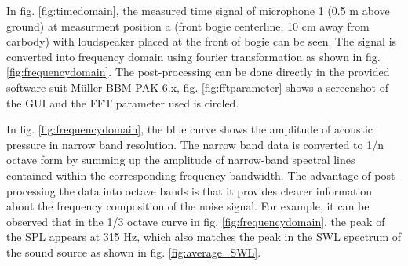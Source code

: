In fig. \ref{fig:timedomain}, the measured time signal of microphone 1 (0.5 m above ground) at measurment position a (front bogie centerline, 10 cm away from carbody) with loudspeaker placed at the front of bogie can be seen. The signal is converted into frequency domain using fourier transformation as shown in fig. \ref{fig:frequencydomain}. The post-processing can be done directly in the provided software suit Müller-BBM PAK 6.x, fig. \ref{fig:fftparameter} shows a screenshot of the GUI and the FFT parameter used is circled.

In fig. \ref{fig:frequencydomain}, the blue curve shows the amplitude of acoustic pressure in narrow band resolution. The narrow band data is converted to 1/n octave form by summing up the amplitude of narrow-band spectral lines contained within the corresponding frequency bandwidth. The advantage of post-processing the data into octave bands is that it provides clearer information about the frequency composition of the noise signal. For example, it can be observed that in the 1/3 octave curve in fig. \ref{fig:frequencydomain}, the peak of the SPL appears at 315 Hz, which also matches the peak in the SWL spectrum of the sound source as shown in fig. \ref{fig:average_SWL}.

